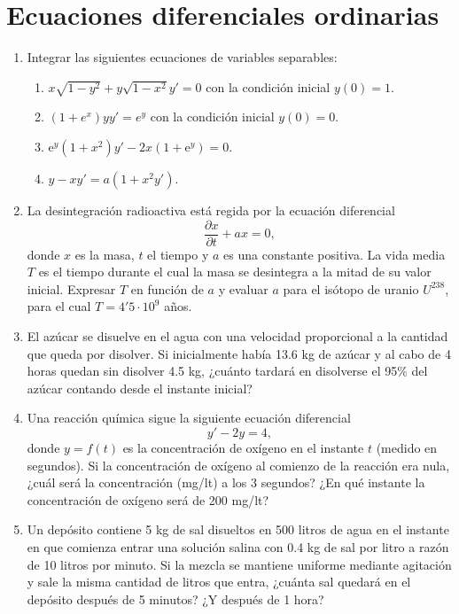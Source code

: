 \documentclass[a4paper,titlepage]{article}
\theoremstyle{solution}
\begin{document}
\section{Ecuaciones diferenciales ordinarias}

\begin{enumerate}[resume, leftmargin=*]
\item Integrar las siguientes ecuaciones de variables separables:
\begin{enumerate}
\item $x\sqrt{1-y^2}+y\sqrt{1-x^2}y'=0$ con la condición inicial $y(0)=1$.
\item $(1+e^x)yy'=e^y$ con la condición inicial $y(0)=0$.
\item e$^y(1+x^2)y'-2x(1+\mbox{e}^y)=0$.
\item $y-xy'=a(1+x^2y')$.
\end{enumerate}

\item La desintegración radioactiva está regida por la ecuación diferencial
\[
\frac{\partial x}{\partial t}+ax=0,
\]
donde $x$ es la masa, $t$ el tiempo y $a$ es una constante positiva.
La vida media $T$ es el tiempo durante el cual la masa se desintegra a la mitad de su valor inicial. Expresar $T$ en función de $a$ y evaluar $a$ para el isótopo de uranio $U^{238}$, para el cual $T=4'5\cdot10^9$ años. 

\item El azúcar se disuelve en el agua con una velocidad proporcional a la cantidad que queda por disolver. 
Si inicialmente había 13.6 kg de azúcar y al cabo de 4 horas quedan sin disolver 4.5 kg, ¿cuánto tardará en disolverse el 95\% del azúcar contando desde el instante inicial?

\item Una reacción química sigue la siguiente ecuación diferencial
\[
y'-2y=4,
\]
donde $y=f(t)$ es la concentración de oxígeno en el instante $t$ (medido en segundos).
Si la concentración de oxígeno al comienzo de la reacción era nula, ¿cuál será la concentración (mg/lt) a los 3 segundos? ¿En qué instante la
concentración de oxígeno será de 200 mg/lt?

\item Un depósito contiene 5 kg de sal disueltos en 500 litros de agua en el instante en que comienza entrar una solución salina con 0.4 kg de sal por litro a razón de 10 litros por minuto.
Si la mezcla se mantiene uniforme mediante agitación y sale la misma cantidad de litros que entra, ¿cuánta sal quedará en el depósito después de 5 minutos?
¿Y después de 1 hora?   


\end{enumerate}
\end{document}
